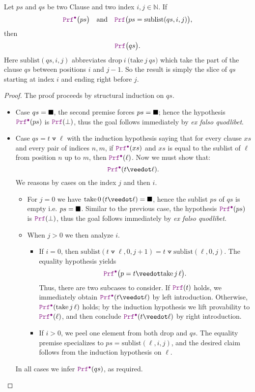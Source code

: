 \begin{lemma}\label{lem:orN_subList}
Let $ps$ and $qs$ be two Clause and two index $i,j \in \mathbb{N}$. If 
\[
\prfcl\bigl(ps\bigr)
\quad\text{and}\quad
\prf\bigl(ps = \mathrm{sublist}(qs,i,j)\bigr),
\]
then
\[
\prf\bigl(qs\bigr).
\]
Here $\mathrm{sublist}(qs,i,j)$ abbreviates $\mathrm{drop}~i~\bigl(\mathrm{take}~j~qs\bigr)$ which take the part of the clause $qs$ between positions $i$ and $j-1$.
So the result is simply the slice of $qs$ starting at index  $i$ and ending right before $j$.
\begin{proof}
The proof proceeds by structural induction on $qs$.
\begin{itemize}
  \item[] Case $qs=\blacksquare$, the second premise forces $ps=\blacksquare$; hence the hypothesis $\prfcl(ps)$ is $\prf(\bot)$, thus the goal follows immediately by \emph{ex falso quodlibet}.
  \item[] Case $qs=t \veedot \ell$ with the induction hypothesis saying that for every clause $xs$ and every pair of indices $n,m$, if $\prfcl(xs)$ and $xs$ is equal to the sublist of $\ell$ from position $n$ up to $m$, then $\prfcl(\ell)$.
    Now we must show that:
    \[
        \prfcl (t \veedot \ell).
    \]
    We reasons by cases on the index $j$ and then $i$.
    \begin{itemize}
      \item For $j=0$ we have $\mathrm{take}\,0\,(t \veedot \ell)=\nil$, hence the sublist $ps$ of $qs$ is empty i.e. $ps = \blacksquare$.
      Similar to the previous case, the hypothesis $\prfcl(ps)$ is $\prf(\bot)$, thus the goal follows immediately by \emph{ex falso quodlibet}.
      
      \item When $j > 0$ we then analyze $i$.
        \begin{itemize}
          \item If $i=0$, then $\mathrm{sublist}(t \veedot \ell,0,j{+}1)= t \veedot \mathrm{sublist}(\ell,0,j)$.
            The equality hypothesis yields
            \[
              \prfcl\bigl(p = t \veedot \mathrm{take}\,j\,\ell\bigr).
            \]
            Thus, there are two subcases to consider.
            If $\prf(t)$ holds, we immediately obtain $\prfcl(t \veedot \ell)$ by left introduction.
            Otherwise, $\prfcl(\mathrm{take}\,j\,\ell)$ holds; by the induction hypothesis we lift provability to $\prfcl(\ell)$, and then conclude $\prfcl(t \veedot \ell)$ by right introduction.
          \item If $i > 0$, we peel one element from both $\mathrm{drop}$ and $qs$.
            The equality premise specializes to $ps=\mathrm{sublist}(\ell,i,j)$, and the desired claim follows from the induction hypothesis on $\ell$.
          \end{itemize}
    \end{itemize}
  In all cases we infer $\prfcl(qs)$, as required.
\end{itemize}
\end{proof}
\end{lemma}


